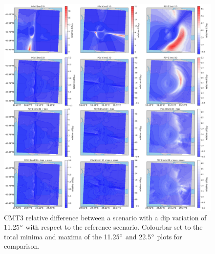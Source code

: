 \documentclass[../Text/00main.tex]{subfiles}
\begin{document}
\begin{figure}[!h]
    \centering
    \includegraphics[width=1\linewidth,trim = 2cm 5cm 1cm 5cm, clip]{images_results/dip_variation_epsilon12_sc3.png}
    \caption{CMT3 relative difference between a scenario with a dip variation of 11.25$\degree$ with respect to the reference scenario. Colourbar set to the total minima and maxima of the 11.25$\degree$ and 22.5$\degree$ plots for comparison.}
    \label{fig:ref_eps12-2}
\end{figure}
\end{document}
